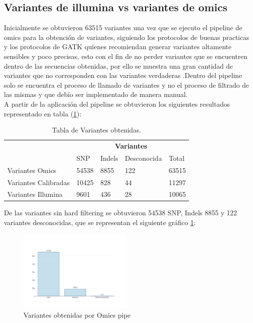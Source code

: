 \subsection*{Variantes de illumina vs variantes de omics}

Inicialmente se obtuvieron 63515 variantes una vez que se ejecuto el pipeline de omics para la obtención de variantes, siguiendo los protocolos de buenas practicas y los protocolos de GATK quienes recomiendan generar variantes altamente sensibles y poco precisas, esto con el fin de no perder variantes que se encuentren dentro de las secuencias obtenidas, por ello se muestra una gran cantidad de variantes que no corresponden con las variantes verdaderas \cite{Auwera2014}.Dentro del pipeline solo se encuentra el proceso de llamado de variantes y no el proceso de filtrado de las mismas y que debío ser implementado de manera manual.\\

A partir de la aplicación del pipeline se obtuvieron los siguientes resultados representado en tabla (\ref{tabla:final}):

\begin{table}[htb]
	\centering
	\begin{tabular}{|l|l|l|l|l|}
		\hline
		& \multicolumn{4}{c|}{\textbf{Variantes}} \\
		\cline{2-5} 
		& SNP  & Indels & Desconocida & Total \\ \cline{2-5}
		\hline 
		\multirow{1}{4cm}{Variantes Omics} & 54538 & 8855 & 122 & 63515 \\ \cline{2-5}
		\hline 
		\multirow{1}{4cm}{Variantes Calibradas} & 10425 & 828 & 44 & 11297 \\ \cline{2-5}
		\hline
		\multirow{1}{4cm}{Variantes Illumina} & 9601 & 436 & 28 & 10065 \\ \cline{2-5}
		\hline
	\end{tabular}
	\caption{Tabla de Variantes obtenidas.}
	\label{tabla:final}
\end{table}

De las variantes sin hard filtering se obtuvieron 54538 SNP, Indels 8855 y 122 variantes desconocidas, que se representan el siguiente gráfico \ref{fig:omics}: 

\begin{figure}[H]
	\centering
	\includegraphics[width=0.5\textwidth]{Kap2/variantesomics}
	\caption{Variantes obtenidas por Omics pipe} \label{fig:omics}
\end{figure}

